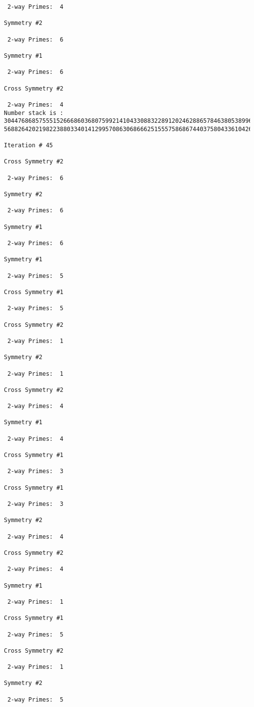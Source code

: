 {{{{\begin{verbatim}
 2-way Primes: 	4

Symmetry #2

 2-way Primes: 	6

Symmetry #1

 2-way Primes: 	6

Cross Symmetry #2

 2-way Primes: 	4
Number stack is :
30447686857555152666860368075992141043308832289120246288657846380538996794608835958544046240163340857
56882642021982238803340141299570863068666251555758686744037580433610426404458595388064976998350836487

Iteration #	45

Cross Symmetry #2

 2-way Primes: 	6

Symmetry #2

 2-way Primes: 	6

Symmetry #1

 2-way Primes: 	6

Symmetry #1

 2-way Primes: 	5

Cross Symmetry #1

 2-way Primes: 	5

Cross Symmetry #2

 2-way Primes: 	1

Symmetry #2

 2-way Primes: 	1

Cross Symmetry #2

 2-way Primes: 	4

Symmetry #1

 2-way Primes: 	4

Cross Symmetry #1

 2-way Primes: 	3

Cross Symmetry #1

 2-way Primes: 	3

Symmetry #2

 2-way Primes: 	4

Cross Symmetry #2

 2-way Primes: 	4

Symmetry #1

 2-way Primes: 	1

Cross Symmetry #1

 2-way Primes: 	5

Cross Symmetry #2

 2-way Primes: 	1

Symmetry #2

 2-way Primes: 	5


\end{verbatim}}}}}
